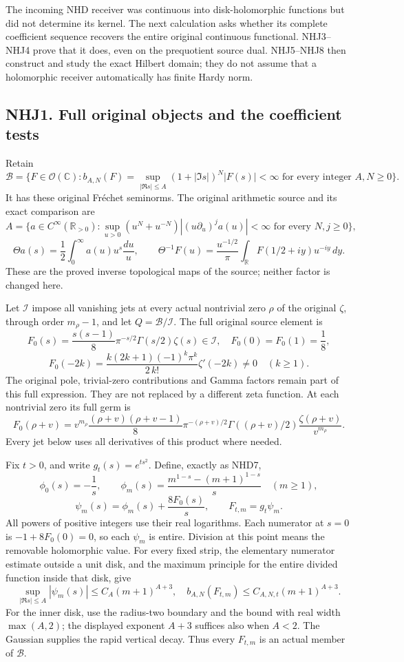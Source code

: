 The incoming NHD receiver was continuous into disk-holomorphic functions
but did not determine its kernel. The next calculation asks whether its
complete coefficient sequence recovers the entire original continuous
functional. NHJ3--NHJ4 prove that it does, even on the prequotient
source dual. NHJ5--NHJ8 then construct and study the exact Hilbert
domain; they do not assume that a holomorphic receiver automatically has
finite Hardy norm.

\subsection{NHJ1. Full original objects and the coefficient
tests}\label{nhj1.-full-original-objects-and-the-coefficient-tests}

Retain \[
\mathcal B=\{F\in\mathcal O(\mathbb C):
b_{A,N}(F)=\sup_{|\Re s|\le A}(1+|\Im s|)^N|F(s)|<\infty
\text{ for every integer }A,N\ge0\}.
\tag{NHJ1.1}
\] It has these original Fréchet seminorms. The original arithmetic
source and its exact comparison are \[
A=\{a\in C^\infty(\mathbb R_{>0}):
\sup_{u>0}(u^N+u^{-N})|(u\partial_u)^j a(u)|<\infty
\text{ for every }N,j\ge0\},
\] \[
\Theta a(s)=\frac12\int_0^\infty a(u)u^s\frac{du}{u},\qquad
\Theta^{-1}F(u)=\frac{u^{-1/2}}\pi
\int_{\mathbb R}F(1/2+iy)u^{-iy}\,dy.
\tag{NHJ1.2}
\] These are the proved inverse topological maps of the source; neither
factor is changed here.

Let \(\mathcal I\) impose all vanishing jets at every actual nontrivial
zero \(\rho\) of the original \(\zeta\), through order \(m_\rho-1\), and
let \(Q=\mathcal B/\mathcal I\). The full original source element is \[
F_0(s)=\frac{s(s-1)}8\pi^{-s/2}\Gamma(s/2)\zeta(s)\in\mathcal I,
\quad F_0(0)=F_0(1)=\frac18,
\] \[
F_0(-2k)=\frac{k(2k+1)(-1)^k\pi^k}{2\,k!}\zeta'(-2k)\ne0
\quad(k\ge1).
\tag{NHJ1.3}
\] The original pole, trivial-zero contributions and Gamma factors
remain part of this full expression. They are not replaced by a
different zeta function. At each nontrivial zero its full germ is \[
F_0(\rho+v)=v^{m_\rho}
\frac{(\rho+v)(\rho+v-1)}8\pi^{-(\rho+v)/2}
\Gamma((\rho+v)/2)\frac{\zeta(\rho+v)}{v^{m_\rho}}.
\tag{NHJ1.4}
\] Every jet below uses all derivatives of this product where needed.

Fix \(t>0\), and write \(g_t(s)=e^{ts^2}\). Define, exactly as NHD7, \[
\phi_0(s)=-\frac1s,\qquad
\phi_m(s)=\frac{m^{1-s}-(m+1)^{1-s}}s\quad(m\ge1),
\] \[
\psi_m(s)=\phi_m(s)+\frac{8F_0(s)}s,
\qquad F_{t,m}=g_t\psi_m.
\tag{NHJ1.5}
\] All powers of positive integers use their real logarithms. Each
numerator at \(s=0\) is \(-1+8F_0(0)=0\), so each \(\psi_m\) is entire.
Division at this point means the removable holomorphic value. For every
fixed strip, the elementary numerator estimate outside a unit disk, and
the maximum principle for the entire divided function inside that disk,
give \[
\sup_{|\Re s|\le A}|\psi_m(s)|\le C_A(m+1)^{A+3},
\quad
b_{A,N}(F_{t,m})\le C_{A,N,t}(m+1)^{A+3}.
\tag{NHJ1.6}
\] For the inner disk, use the radius-two boundary and the bound with
real width \(\max(A,2)\); the displayed exponent \(A+3\) suffices also
when \(A<2\). The Gaussian supplies the rapid vertical decay. Thus every
\(F_{t,m}\) is an actual member of \(\mathcal B\).

